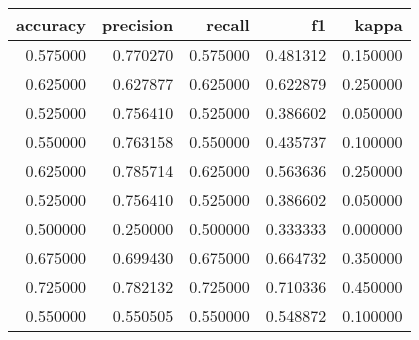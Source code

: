 \begin{tabular}{rrrrr}
\toprule
accuracy & precision & recall & f1 & kappa \\
\midrule
0.575000 & 0.770270 & 0.575000 & 0.481312 & 0.150000 \\
0.625000 & 0.627877 & 0.625000 & 0.622879 & 0.250000 \\
0.525000 & 0.756410 & 0.525000 & 0.386602 & 0.050000 \\
0.550000 & 0.763158 & 0.550000 & 0.435737 & 0.100000 \\
0.625000 & 0.785714 & 0.625000 & 0.563636 & 0.250000 \\
0.525000 & 0.756410 & 0.525000 & 0.386602 & 0.050000 \\
0.500000 & 0.250000 & 0.500000 & 0.333333 & 0.000000 \\
0.675000 & 0.699430 & 0.675000 & 0.664732 & 0.350000 \\
0.725000 & 0.782132 & 0.725000 & 0.710336 & 0.450000 \\
0.550000 & 0.550505 & 0.550000 & 0.548872 & 0.100000 \\
\bottomrule
\end{tabular}
